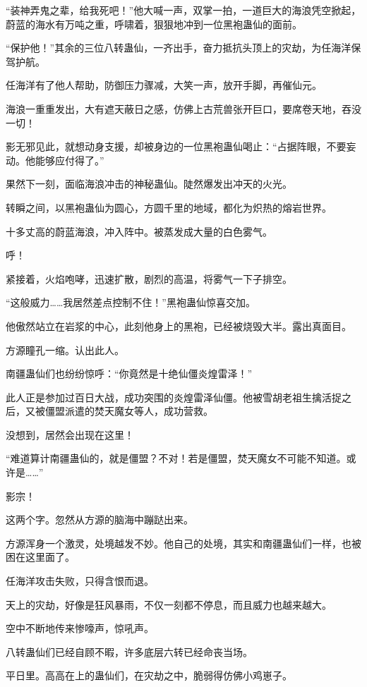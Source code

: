 \begin{this_body}
“装神弄鬼之辈，给我死吧！”他大喊一声，双掌一拍，一道巨大的海浪凭空掀起，蔚蓝的海水有万吨之重，呼啸着，狠狠地冲到一位黑袍蛊仙的面前。

“保护他！”其余的三位八转蛊仙，一齐出手，奋力抵抗头顶上的灾劫，为任海洋保驾护航。

任海洋有了他人帮助，防御压力骤减，大笑一声，放开手脚，再催仙元。

海浪一重重发出，大有遮天蔽日之感，仿佛上古荒兽张开巨口，要席卷天地，吞没一切！

影无邪见此，就想动身支援，却被身边的一位黑袍蛊仙喝止：“占据阵眼，不要妄动。他能够应付得了。”

果然下一刻，面临海浪冲击的神秘蛊仙。陡然爆发出冲天的火光。

转瞬之间，以黑袍蛊仙为圆心，方圆千里的地域，都化为炽热的熔岩世界。

十多丈高的蔚蓝海浪，冲入阵中。被蒸发成大量的白色雾气。

呼！

紧接着，火焰咆哮，迅速扩散，剧烈的高温，将雾气一下子排空。

“这般威力……我居然差点控制不住！”黑袍蛊仙惊喜交加。

他傲然站立在岩浆的中心，此刻他身上的黑袍，已经被烧毁大半。露出真面目。

方源瞳孔一缩。认出此人。

南疆蛊仙们也纷纷惊呼：“你竟然是十绝仙僵炎煌雷泽！”

此人正是参加过百日大战，成功突围的炎煌雷泽仙僵。他被雪胡老祖生擒活捉之后，又被僵盟派遣的焚天魔女等人，成功营救。

没想到，居然会出现在这里！

“难道算计南疆蛊仙的，就是僵盟？不对！若是僵盟，焚天魔女不可能不知道。或许是……”

影宗！

这两个字。忽然从方源的脑海中蹦跶出来。

方源浑身一个激灵，处境越发不妙。他自己的处境，其实和南疆蛊仙们一样，也被困在这里面了。

任海洋攻击失败，只得含恨而退。

天上的灾劫，好像是狂风暴雨，不仅一刻都不停息，而且威力也越来越大。

空中不断地传来惨嚎声，惊吼声。

八转蛊仙们已经自顾不暇，许多底层六转已经命丧当场。

平日里。高高在上的蛊仙们，在灾劫之中，脆弱得仿佛小鸡崽子。


\end{this_body}
